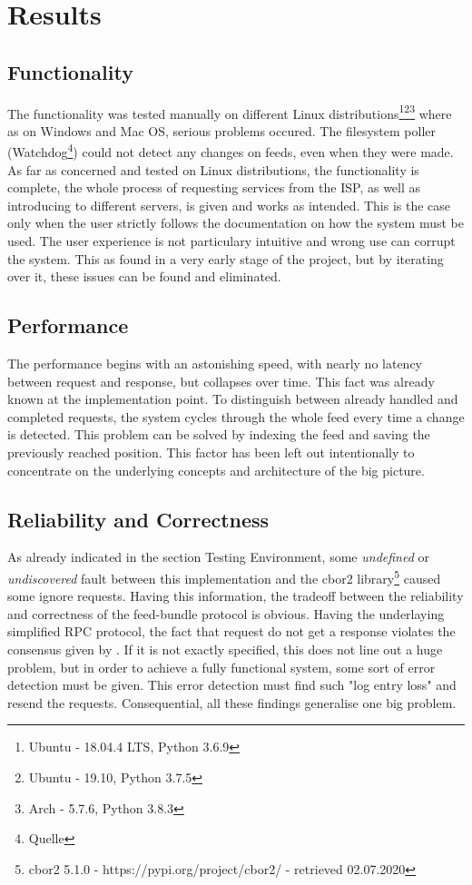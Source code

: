 \section{Results}
\subsection{Functionality}
The functionality was tested manually on different Linux distributions\footnote{Ubuntu - 18.04.4 LTS, Python 3.6.9}\footnote{Ubuntu - 19.10, Python 3.7.5}\footnote{Arch - 5.7.6, Python 3.8.3} where as on Windows and Mac OS, serious problems occured. The filesystem poller (Watchdog\footnote{Quelle}) could not detect any changes on feeds, even when they were made. As far as concerned and tested on Linux distributions, the functionality is complete, the whole process of requesting services from the ISP, as well as introducing to different servers, is given and works as intended. This is the case only when the user strictly follows the documentation on how the system must be used. The user experience is not particulary intuitive and wrong use can corrupt the system. This as found in a very early stage of the project, but by iterating over it, these issues can be found and eliminated.
\subsection{Performance}
The performance begins with an astonishing speed, with nearly no latency between request and response, but collapses over time. This fact was already known at the implementation point. To distinguish between already handled and completed requests, the system cycles through the whole feed every time a change is detected. This problem can be solved by indexing the feed and saving the previously reached position. This factor has been left out intentionally to concentrate on the underlying concepts and architecture of the big 
picture.
\subsection{Reliability and Correctness}
As already indicated in the section Testing Environment, some \textit{undefined} or \textit{undiscovered} fault between this implementation and the cbor2 library\footnote{cbor2 5.1.0 - https://pypi.org/project/cbor2/ - retrieved 02.07.2020} caused some ignore requests. Having this information, the tradeoff between the reliability and correctness of the feed-bundle protocol is obvious. Having the underlaying simplified RPC protocol, the fact that request do not get a response violates the consensus given by \citet{birrell1984implementing}. If it is not exactly specified, this does not line out a huge problem, but in order to achieve a fully functional system, some sort of error detection must be given. This error detection must find such "log entry loss" and resend the requests. Consequential, all these findings generalise one big problem.

